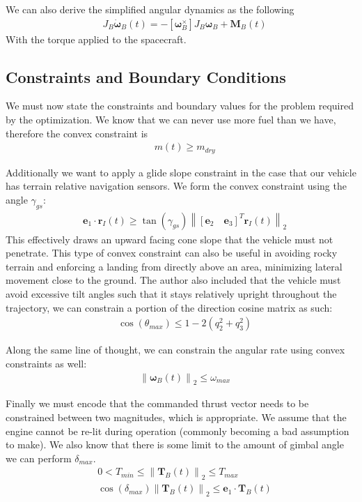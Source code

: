 \documentclass[conf]{new-aiaa}
\begin{document}
\begin{singlespace}
We can also derive the simplified angular dynamics as the following
\begin{align}
& J_B \dot{\bm{\omega}}_B(t) = -\left[\bm{\omega}_B ^ \times\right] J_B \bm{\omega}_B + \mathbf{M}_B(t)
\end{align}
With the torque applied to the spacecraft.


\subsection{Constraints and Boundary Conditions}
We must now state the constraints and boundary values for the problem required by the optimization.
We know that we can never use more fuel than we have, therefore the convex constraint is 
\begin{align}
& m(t) \geq m_{dry}
\end{align}

Additionally we want to apply a glide slope constraint in the case that our vehicle has terrain relative navigation sensors. We form the convex constraint using the angle $\gamma_{gs}$:
\begin{align}
& \mathbf{e}_1 \cdot \mathbf{r}_I(t) \geq \tan(\gamma_{gs}) \left\lVert \left[\mathbf{e}_2 \quad \mathbf{e}_3\right]^T \mathbf{r}_I(t) \right\lVert_2
\end{align}
This effectively draws an upward facing cone slope that the vehicle must not penetrate. This type of convex constraint can also be useful in avoiding rocky terrain and enforcing a landing from directly above an area, minimizing lateral movement close to the ground.
The author also included that the vehicle must avoid excessive tilt angles such that it stays relatively upright throughout the trajectory, we can constrain a portion of the direction cosine matrix as such:
\begin{align}
& \cos(\theta_{max}) \leq 1-2(q_{2}^{2}+q_{3}^{2})
\end{align}

Along the same line of thought, we can constrain the angular rate using convex constraints as well:
\begin{align}
& \left \lVert \bm{\omega}_B(t) \right \lVert_2 \leq \omega_{max}
\end{align}

Finally we must encode that the commanded thrust vector needs to be constrained between two magnitudes, which is appropriate. We assume that the engine cannot be re-lit during operation (commonly becoming a bad assumption to make). We also know that there is some limit to the amount of gimbal angle we can perform $\delta_{max}$.
\begin{align}
& 0 < T_{min} \leq \left \lVert \bm{T}_B(t) \right \lVert_2 \leq T_{max} \\
& \cos(\delta_{max}) \left \lVert \bm{T}_B(t) \right \lVert_2 \leq \bm{e}_1 \cdot \bm{T}_B(t)
\end{align}


\end{singlespace}
\end{document}
